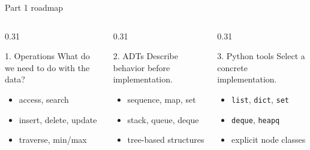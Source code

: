 \documentclass[aspectratio=169]{beamer}
\begin{document}
\begin{frame}{Part 1 roadmap}
\small
\begin{columns}[T,onlytextwidth]
\begin{column}{0.31\textwidth}
\begin{block}{1. Operations}
What do we need to do with the data?
\begin{itemize}
  \item access, search
  \item insert, delete, update
  \item traverse, min/max
\end{itemize}
\end{block}
\end{column}
\begin{column}{0.31\textwidth}
\begin{exampleblock}{2. ADTs}
Describe behavior before implementation.
\begin{itemize}
  \item sequence, map, set
  \item stack, queue, deque
  \item tree-based structures
\end{itemize}
\end{exampleblock}
\end{column}
\begin{column}{0.31\textwidth}
\begin{alertblock}{3. Python tools}
Select a concrete implementation.
\begin{itemize}
  \item \texttt{list}, \texttt{dict}, \texttt{set}
  \item \texttt{deque}, \texttt{heapq}
  \item explicit node classes
\end{itemize}
\end{alertblock}
\end{column}
\end{columns}
\end{frame}
\end{document}
